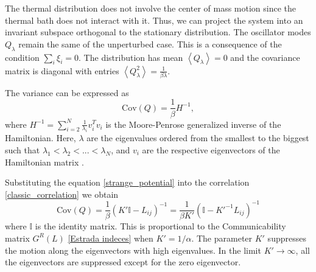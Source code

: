 The thermal distribution does not involve the center of mass motion since the thermal bath does not interact with it. Thus, we can project the system into an invariant subspace orthogonal to the stationary distribution. The oscillator modes $Q_\lambda$ remain the same of the unperturbed case. 
This is a consequence of the condition $\sum_i \xi_i = 0$.
The distribution has mean $\left<Q_\lambda\right>= 0$ and the covariance matrix is diagonal with entries $\left<Q^2_\lambda\right>= \frac{1}{\beta \lambda}$.

The variance can be expressed as
\begin{equation}\label{classic_correlation}
    \mathrm{Cov}(Q) = \frac{1}{\beta}H^{-1},
\end{equation}
where ${H}^{-1} = \sum_{i=2}^N \frac{1}{\lambda_i}v_i^Tv_i$ is the Moore-Penrose generalized inverse of the Hamiltonian. Here, $\lambda$ are the eigenvalues ordered from the smallest to the biggest such that $\lambda_1 < \lambda_2 < ... < \lambda_N$, and $v_i$ are the respective eigenvectors of the Hamiltonian matrix \cite{Generalized_inverse_Laplacian}.

Substituting the equation \eqref{strange_potential} into the correlation \eqref{classic_correlation} we obtain
\begin{equation}
    \mathrm{Cov}(Q) = \frac{1}{\beta}\left(K'\mathbb{I} - L_{ij}\right)^{-1} = \frac{1}{\beta K'}\left(\mathbb{I} - K'^{-1}L_{ij}\right)^{-1}
\end{equation}
where $\mathbb{I}$ is the identity matrix.
This is proportional to the Communicability matrix $G^R(L)$ \eqref{Estrada indeces} when $K' = 1/\alpha$.
The parameter $K'$ suppresses the motion along the eigenvectors with high eigenvalues. In the limit $K'\rightarrow \infty$, all the eigenvectors are suppressed except for the zero eigenvector.


